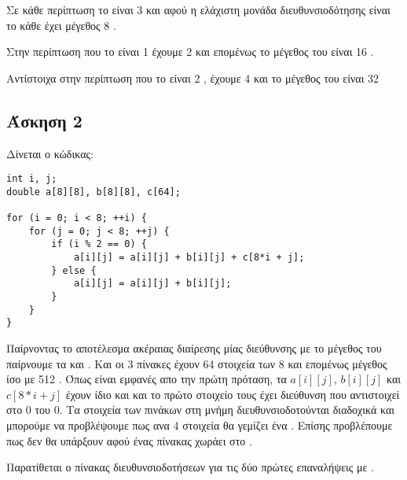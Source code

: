 \documentclass[10pt]{assignment}
\begin{document}
Σε κάθε περίπτωση το  είναι 3  και αφού η ελάχιστη μονάδα διευθυνσιοδότησης είναι το  κάθε  έχει μέγεθος 8 .
 
Στην περίπτωση που το  είναι 1  έχουμε 2  και επομένως το μέγεθος του  είναι 16 .

Αντίστοιχα στην περίπτωση που το  είναι 2 , έχουμε 4
 και το μέγεθος του  είναι 32 	

\newpage
\subsection*{Άσκηση 2}

Δίνεται ο κώδικας:
\begin{center}
\begin{verbatim}
int i, j;
double a[8][8], b[8][8], c[64];

for (i = 0; i < 8; ++i) {
    for (j = 0; j < 8; ++j) {
        if (i % 2 == 0) {
            a[i][j] = a[i][j] + b[i][j] + c[8*i + j];
        } else {
            a[i][j] = a[i][j] + b[i][j];
        }
    }
}
\end{verbatim}
\end{center}
Παίρνοντας το αποτέλεσμα ακέραιας διαίρεσης μίας διεύθυνσης με το μέγεθος του 
παίρνουμε τα  και . Και οι 3 πίνακες έχουν 64 στοιχεία των 8 
 και επομένως μέγεθος ίσο με 512 . Όπως είναι εμφανές απο την πρώτη πρόταση, τα $a[i][j]$, $b[i][j]$ και $c[8*i+j]$ έχουν ίδιο  και  και το πρώτο στοιχείο τους έχει διεύθυνση που αντιστοιχεί στο  0 του  0. Τα στοιχεία των πινάκων στη μνήμη διευθυνσιοδοτούνται διαδοχικά και μπορούμε να προβλέψουμε πως ανα 4 στοιχεία θα γεμίζει ένα . Επίσης προβλέπουμε πως δεν θα
υπάρξουν  αφού ένας πίνακας χωράει στο . 

Παρατίθεται ο πίνακας διευθυνσιοδοτήσεων για τις δύο πρώτες επαναλήψεις με .
\end{document}
